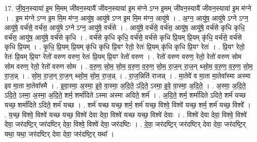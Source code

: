 \documentclass[17pt]{extarticle}
\begin{document}
17. जी॒व॒न॒स्याया॑ इ॒म मि॒मम् जी॑वन॒स्यायै॑ जीवन॒स्याया॑ इ॒म म॑ग्ने ऽग्न इ॒मम् जी॑वन॒स्यायै॑ जीवन॒स्याया॑ इ॒म म॑ग्ने । . इ॒म म॑ग्ने ऽग्न इ॒म मि॒म म॑ग्न॒ आयु॑ष॒ आयु॑षे ऽग्न इ॒म मि॒म म॑ग्न॒ आयु॑षे । . अ॒ग्न॒ आयु॑ष॒ आयु॑षे ऽग्ने ऽग्न॒ आयु॑षे॒ वर्च॑से॒ वर्च॑स॒ आयु॑षे ऽग्ने ऽग्न॒ आयु॑षे॒ वर्च॑से । . आयु॑षे॒ वर्च॑से॒ वर्च॑स॒ आयु॑ष॒ आयु॑षे॒ वर्च॑से कृधि कृधि॒ वर्च॑स॒ आयु॑ष॒ आयु॑षे॒ वर्च॑से कृधि । . वर्च॑से कृधि कृधि॒ वर्च॑से॒ वर्च॑से कृधि प्रि॒यम् प्रि॒यम् कृ॑धि॒ वर्च॑से॒ वर्च॑से कृधि प्रि॒यम् । . कृ॒धि॒ प्रि॒यम् प्रि॒यम् कृ॑धि कृधि प्रि॒यꣳ रेतो॒ रेतः॑ प्रि॒यम् कृ॑धि कृधि प्रि॒यꣳ रेतः॑ । . प्रि॒यꣳ रेतो॒ रेतः॑ प्रि॒यम् प्रि॒यꣳ रेतो॑ वरुण वरुण॒ रेतः॑ प्रि॒यम् प्रि॒यꣳ रेतो॑ वरुण । . रेतो॑ वरुण वरुण॒ रेतो॒ रेतो॑ वरुण सोम सोम वरुण॒ रेतो॒ रेतो॑ वरुण सोम । . व॒रु॒ण॒ सो॒म॒ सो॒म॒ व॒रु॒ण॒ व॒रु॒ण॒ सो॒म॒ रा॒ज॒न् रा॒ज॒न् थ्सो॒म॒ व॒रु॒ण॒ व॒रु॒ण॒ सो॒म॒ रा॒ज॒न्न् । . सो॒म॒ रा॒ज॒न् रा॒ज॒न् थ्सो॒म॒ सो॒म॒ रा॒ज॒न्न् । . रा॒ज॒न्निति॑ राजन्न् । . मा॒तेवे॑ व मा॒ता मा॒तेवा᳚स्मा अस्मा इव मा॒ता मा॒तेवा᳚स्मै । . इ॒वा॒स्मा॒ अ॒स्मा॒ इ॒वे॒ वा॒स्मा॒ अ॒दि॒ते॒ ऽदि॒ते॒ ऽस्मा॒ इ॒वे॒ वा॒स्मा॒ अ॒दि॒ते॒ । . अ॒स्मा॒ अ॒दि॒ते॒ ऽदि॒ते॒ ऽस्मा॒ अ॒स्मा॒ अ॒दि॒ते॒ शर्म॒ शर्मा॑दिते ऽस्मा अस्मा अदिते॒ शर्म॑ । . अ॒दि॒ते॒ शर्म॒ शर्मा॑दिते ऽदिते॒ शर्म॑ यच्छ यच्छ॒ शर्मा॑दिते ऽदिते॒ शर्म॑ यच्छ । . शर्म॑ यच्छ यच्छ॒ शर्म॒ शर्म॑ यच्छ॒ विश्वे॒ विश्वे॑ यच्छ॒ शर्म॒ शर्म॑ यच्छ॒ विश्वे᳚ । . य॒च्छ॒ विश्वे॒ विश्वे॑ यच्छ यच्छ॒ विश्वे॑ देवा देवा॒ विश्वे॑ यच्छ यच्छ॒ विश्वे॑ देवाः । . विश्वे॑ देवा देवा॒ विश्वे॒ विश्वे॑ देवा॒ जर॑दष्टि॒र् जर॑दष्टिर् देवा॒ विश्वे॒ विश्वे॑ देवा॒ जर॑दष्टिः । . दे॒वा॒ जर॑दष्टि॒र् जर॑दष्टिर् देवा देवा॒ जर॑दष्टि॒र् यथा॒ यथा॒ जर॑दष्टिर् देवा देवा॒ जर॑दष्टि॒र् यथा᳚ । \newline
\end{document}
